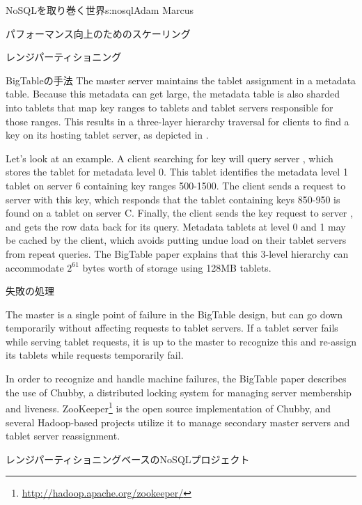\begin{aosachapter}{NoSQLを取り巻く世界}{s:nosql}{Adam Marcus}
\begin{aosasect1}{パフォーマンス向上のためのスケーリング}
\begin{aosasect2}{レンジパーティショニング}
\begin{aosasect3}{BigTableの手法}
The master server maintains the tablet assignment in a metadata table.
Because this metadata can get large, the metadata table is also
sharded into tablets that map key ranges to tablets and tablet servers
responsible for those ranges.  This results in a three-layer hierarchy
traversal for clients to find a key on its hosting tablet server,
as depicted in .

Let's look at an example.  A client searching for key
 will query server , which stores the tablet for
metadata level 0.  This tablet identifies the metadata level 1 tablet
on server 6 containing key ranges 500-1500.  The client sends a
request to server  with this key, which responds that the
tablet containing keys 850-950 is found on a tablet on server
C\@.  Finally, the client sends the key request to server , and
gets the row data back for its query.  Metadata tablets at level 0 and
1 may be cached by the client, which avoids putting undue load on
their tablet servers from repeat queries.  The BigTable paper explains
that this 3-level hierarchy can accommodate $2^{61}$ bytes worth of storage
using 128MB tablets.

\end{aosasect3}

\vspace{-0.1cm} %
\begin{aosasect3}{失敗の処理}

The master is a single point of failure in the BigTable design, but
can go down temporarily without affecting requests to tablet servers.
If a tablet server fails while serving tablet requests, it is up to
the master to recognize this and re-assign its tablets while requests
temporarily fail.

In order to recognize and handle machine failures, the BigTable paper
describes the use of Chubby, a distributed locking system for managing
server membership and liveness.
ZooKeeper\footnote{\url{http://hadoop.apache.org/zookeeper/}} is the
open source implementation of Chubby, and several Hadoop-based
projects utilize it to manage secondary master servers and tablet
server reassignment.

\end{aosasect3}

\begin{aosasect3}{レンジパーティショニングベースのNoSQLプロジェクト}


\end{aosasect3}
\end{aosasect2}
\end{aosasect1}
\end{aosachapter}
